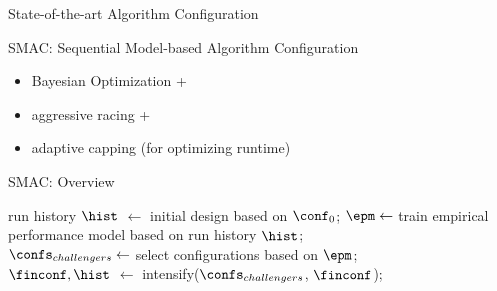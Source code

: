 \begin{frame}[c]{State-of-the-art Algorithm Configuration}

SMAC: Sequential Model-based Algorithm Configuration 

\begin{itemize}
	\item Bayesian Optimization +
	\item aggressive racing +
	\item adaptive capping (for optimizing runtime)
\end{itemize}

\end{frame}
\begin{frame}[c]{SMAC: Overview }

\LinesNotNumbered
\begin{algorithm}[H]
\BlankLine
run history $\hist$ $\leftarrow$ initial design based on $\conf_0$; 
 {
	\pause
	$\epm \leftarrow$ train empirical performance model based on run history $\hist$;\\
	\pause
	$\confs_{challengers} \leftarrow$ select configurations based on $\epm$;\\
	\pause
	$\finconf, \hist$  $\leftarrow$ intensify($\confs_{challengers}$, $\finconf$); 
}
\pause
\Return{$\finconf$}
\caption{SMAC}
\end{algorithm}

\end{frame}

